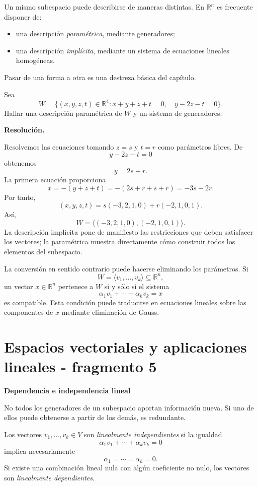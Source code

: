 Un mismo subespacio puede describirse de maneras distintas. En $\mathbb{R}^n$ es frecuente disponer de:
\begin{itemize}
\item una descripción \emph{paramétrica}, mediante generadores;
\item una descripción \emph{implícita}, mediante un sistema de ecuaciones lineales homogéneas.
\end{itemize}
Pasar de una forma a otra es una destreza básica del capítulo.

\begin{solvedexercise}
Sea
\[
W=\{(x,y,z,t)\in\mathbb{R}^4:x+y+z+t=0,\quad y-2z-t=0\}.
\]
Hallar una descripción paramétrica de $W$ y un sistema de generadores.

\textbf{Resolución.}\par\smallskip
Resolvemos las ecuaciones tomando $z=s$ y $t=r$ como parámetros libres. De
\[
y-2z-t=0
\]
obtenemos
\[
y=2s+r.
\]
La primera ecuación proporciona
\[
x=-(y+z+t)=-(2s+r+s+r)=-3s-2r.
\]
Por tanto,
\[
(x,y,z,t)
=s(-3,2,1,0)+r(-2,1,0,1).
\]
Así,
\[
\boxed{W=\langle(-3,2,1,0),(-2,1,0,1)\rangle.}
\]
La descripción implícita pone de manifiesto las restricciones que deben satisfacer los vectores; la paramétrica muestra directamente cómo construir todos los elementos del subespacio.
\end{solvedexercise}

La conversión en sentido contrario puede hacerse eliminando los parámetros. Si
\[
W=\langle v_1,\ldots,v_k\rangle\subseteq\mathbb{R}^n,
\]
un vector $x\in\mathbb{R}^n$ pertenece a $W$ si y sólo si el sistema
\[
\alpha_1v_1+\cdots+\alpha_kv_k=x
\]
es compatible. Esta condición puede traducirse en ecuaciones lineales sobre las componentes de $x$ mediante eliminación de Gauss.


\section{Espacios vectoriales y aplicaciones lineales - fragmento 5}
\textbf{Dependencia e independencia lineal}

No todos los generadores de un subespacio aportan información nueva. Si uno de ellos puede obtenerse a partir de los demás, es redundante.

\begin{definition}
Los vectores $v_1,\ldots,v_k\in V$ son \emph{linealmente independientes} si la igualdad
\[
\alpha_1v_1+\cdots+\alpha_kv_k=0
\]
implica necesariamente
\[
\alpha_1=\cdots=\alpha_k=0.
\]
Si existe una combinación lineal nula con algún coeficiente no nulo, los vectores son \emph{linealmente dependientes}.
\end{definition}


